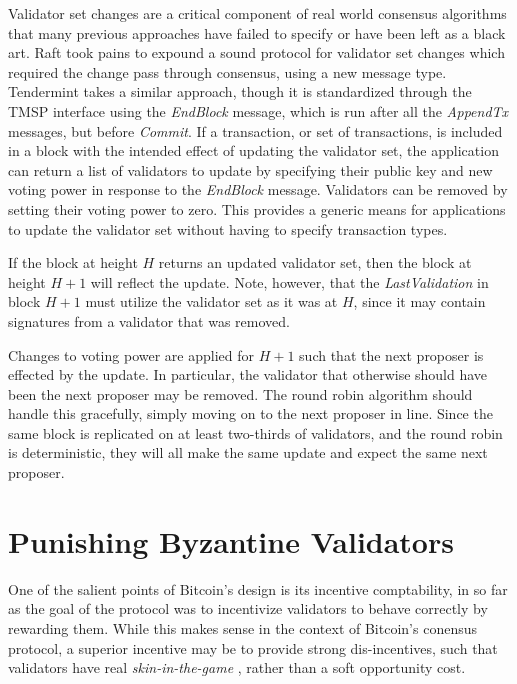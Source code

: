 Validator set changes are a critical component of real world consensus algorithms that many previous approaches have failed to specify 
or have been left as a black art. 
Raft took pains to expound a sound protocol for validator set changes which required the change pass through consensus, 
using a new message type.
Tendermint takes a similar approach, though it is standardized through the TMSP interface using the \emph{EndBlock} message,
which is run after all the \emph{AppendTx} messages, but before \emph{Commit}.
If a transaction, or set of transactions, is included in a block with the intended effect of updating the validator set,
the application can return a list of validators to update by specifying their public key and new voting power 
in response to the \emph{EndBlock} message.
Validators can be removed by setting their voting power to zero.
This provides a generic means for applications to update the validator set without having to specify transaction types.

If the block at height $H$ returns an updated validator set, 
then the block at height $H+1$ will reflect the update.
Note, however, that the \emph{LastValidation} in block $H+1$
must utilize the validator set as it was at $H$, 
since it may contain signatures from a validator that was removed.

Changes to voting power are applied for $H+1$ such that the next proposer 
is effected by the update. 
In particular, the validator that otherwise should have been the next proposer may be removed.
The round robin algorithm should handle this gracefully, simply moving on to the next proposer in line.
Since the same block is replicated on at least two-thirds of validators, 
and the round robin is deterministic,
they will all make the same update and expect the same next proposer.

\section{Punishing Byzantine Validators}

One of the salient points of Bitcoin's design is its incentive comptability, 
in so far as the goal of the protocol was to incentivize validators to behave correctly
by rewarding them. While this makes sense in the context of Bitcoin's conensus protocol,
a superior incentive may be to provide strong dis-incentives, such that validators
have real \emph{skin-in-the-game} \cite{taleb2014skin}, rather than a soft opportunity cost.


